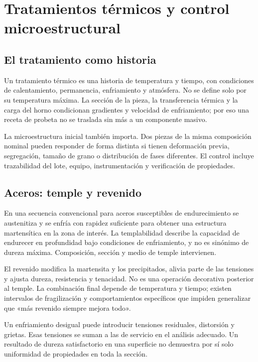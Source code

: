 \chapter{Tratamientos térmicos y control microestructural}\label{ch:08}
\section{El tratamiento como historia}
Un tratamiento térmico es una historia de temperatura y tiempo, con condiciones de calentamiento, permanencia, enfriamiento y atmósfera. No se define solo por su temperatura máxima. La sección de la pieza, la transferencia térmica y la carga del horno condicionan gradientes y velocidad de enfriamiento; por eso una receta de probeta no se traslada sin más a un componente masivo.

La microestructura inicial también importa. Dos piezas de la misma composición nominal pueden responder de forma distinta si tienen deformación previa, segregación, tamaño de grano o distribución de fases diferentes. El control incluye trazabilidad del lote, equipo, instrumentación y verificación de propiedades.
\section{Aceros: temple y revenido}
En una secuencia convencional para aceros susceptibles de endurecimiento se austenitiza y se enfría con rapidez suficiente para obtener una estructura martensítica en la zona de interés. La templabilidad describe la capacidad de endurecer en profundidad bajo condiciones de enfriamiento, y no es sinónimo de dureza máxima. Composición, sección y medio de temple intervienen.

El revenido modifica la martensita y los precipitados, alivia parte de las tensiones y ajusta dureza, resistencia y tenacidad. No es una operación decorativa posterior al temple. La combinación final depende de temperatura y tiempo; existen intervalos de fragilización y comportamientos específicos que impiden generalizar que «más revenido siempre mejora todo».

Un enfriamiento desigual puede introducir tensiones residuales, distorsión y grietas. Esas tensiones se suman a las de servicio en el análisis adecuado. Un resultado de dureza satisfactorio en una superficie no demuestra por sí solo uniformidad de propiedades en toda la sección.
